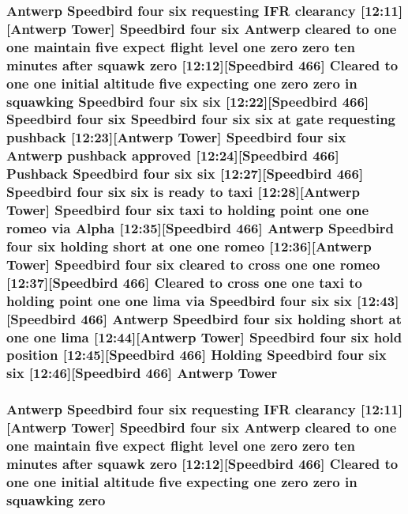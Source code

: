 \subsubsection[{\texorpdfstring{Tower}{Tower}}]{\setlength{\rightskip}{0pt plus 5cm}Antwerp Speedbird four {\bf six} requesting I\+FR clearancy \mbox{[}12\+:11\mbox{]}\mbox{[}Antwerp Tower\mbox{]} Speedbird four {\bf six} Antwerp cleared to {\bf one} {\bf one} maintain five expect flight level {\bf one} {\bf zero} {\bf zero} {\bf ten} minutes after squawk {\bf zero} \mbox{[}12\+:12\mbox{]}\mbox{[}Speedbird 466\mbox{]} Cleared to {\bf one} {\bf one} initial altitude five expecting {\bf one} {\bf zero} {\bf zero} in {\bf squawking} Speedbird four {\bf six} {\bf six} \mbox{[}12\+:22\mbox{]}\mbox{[}Speedbird 466\mbox{]} Speedbird four {\bf six} Speedbird four {\bf six} {\bf six} at gate requesting pushback \mbox{[}12\+:23\mbox{]}\mbox{[}Antwerp Tower\mbox{]} Speedbird four {\bf six} Antwerp pushback {\bf approved} \mbox{[}12\+:24\mbox{]}\mbox{[}Speedbird 466\mbox{]} Pushback Speedbird four {\bf six} {\bf six} \mbox{[}12\+:27\mbox{]}\mbox{[}Speedbird 466\mbox{]} Speedbird four {\bf six} {\bf six} is ready to taxi \mbox{[}12\+:28\mbox{]}\mbox{[}Antwerp Tower\mbox{]} Speedbird four {\bf six} taxi to holding point {\bf one} {\bf one} {\bf romeo} via {\bf Alpha} \mbox{[}12\+:35\mbox{]}\mbox{[}Speedbird 466\mbox{]} Antwerp Speedbird four {\bf six} holding short at {\bf one} {\bf one} {\bf romeo} \mbox{[}12\+:36\mbox{]}\mbox{[}Antwerp Tower\mbox{]} Speedbird four {\bf six} cleared to cross {\bf one} {\bf one} {\bf romeo} \mbox{[}12\+:37\mbox{]}\mbox{[}Speedbird 466\mbox{]} Cleared to cross {\bf one} {\bf one} taxi to holding point {\bf one} {\bf one} {\bf lima} via Speedbird four {\bf six} {\bf six} \mbox{[}12\+:43\mbox{]}\mbox{[}Speedbird 466\mbox{]} Antwerp Speedbird four {\bf six} holding short at {\bf one} {\bf one} {\bf lima} \mbox{[}12\+:44\mbox{]}\mbox{[}Antwerp Tower\mbox{]} Speedbird four {\bf six} hold {\bf position} \mbox{[}12\+:45\mbox{]}\mbox{[}Speedbird 466\mbox{]} Holding Speedbird four {\bf six} {\bf six} \mbox{[}12\+:46\mbox{]}\mbox{[}Speedbird 466\mbox{]} Antwerp Tower}\hypertarget{happyDay4ATC_8txt_a89eefcb2eadbbad8e4779c0d5874f895}{}\label{happyDay4ATC_8txt_a89eefcb2eadbbad8e4779c0d5874f895}
\subsubsection[{\texorpdfstring{zero}{zero}}]{\setlength{\rightskip}{0pt plus 5cm}Antwerp Speedbird four {\bf six} requesting I\+FR clearancy \mbox{[}12\+:11\mbox{]}\mbox{[}Antwerp {\bf Tower}\mbox{]} Speedbird four {\bf six} Antwerp cleared to {\bf one} {\bf one} maintain five expect flight level {\bf one} zero zero {\bf ten} minutes after squawk zero \mbox{[}12\+:12\mbox{]}\mbox{[}Speedbird 466\mbox{]} Cleared to {\bf one} {\bf one} initial altitude five expecting {\bf one} zero zero in {\bf squawking} zero}\hypertarget{happyDay4ATC_8txt_a1cdb3e947394a8f9b50cff125d86fb29}{}\label{happyDay4ATC_8txt_a1cdb3e947394a8f9b50cff125d86fb29}
